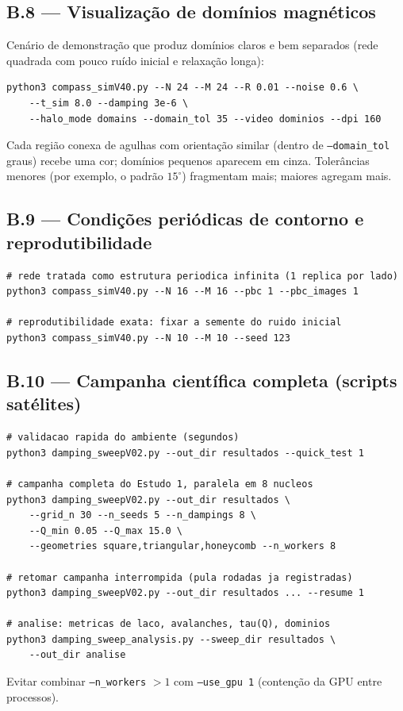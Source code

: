 \documentclass[11pt,a4paper]{article}
\newcommand{\code}[1]{\texttt{#1}}
\begin{document}
\subsection*{B.8 --- Visualização de domínios magnéticos}

Cenário de demonstração que produz domínios claros e bem separados
(rede quadrada com pouco ruído inicial e relaxação longa):
\begin{verbatim}
python3 compass_simV40.py --N 24 --M 24 --R 0.01 --noise 0.6 \
    --t_sim 8.0 --damping 3e-6 \
    --halo_mode domains --domain_tol 35 --video dominios --dpi 160
\end{verbatim}
Cada região conexa de agulhas com orientação similar (dentro de
\code{--domain\_tol} graus) recebe uma cor; domínios pequenos aparecem
em cinza. Tolerâncias menores (por exemplo, o padrão $15^\circ$)
fragmentam mais; maiores agregam mais.

\subsection*{B.9 --- Condições periódicas de contorno e
reprodutibilidade}

\begin{verbatim}
# rede tratada como estrutura periodica infinita (1 replica por lado)
python3 compass_simV40.py --N 16 --M 16 --pbc 1 --pbc_images 1

# reprodutibilidade exata: fixar a semente do ruido inicial
python3 compass_simV40.py --N 10 --M 10 --seed 123
\end{verbatim}

\subsection*{B.10 --- Campanha científica completa (scripts satélites)}

\begin{verbatim}
# validacao rapida do ambiente (segundos)
python3 damping_sweepV02.py --out_dir resultados --quick_test 1

# campanha completa do Estudo 1, paralela em 8 nucleos
python3 damping_sweepV02.py --out_dir resultados \
    --grid_n 30 --n_seeds 5 --n_dampings 8 \
    --Q_min 0.05 --Q_max 15.0 \
    --geometries square,triangular,honeycomb --n_workers 8

# retomar campanha interrompida (pula rodadas ja registradas)
python3 damping_sweepV02.py --out_dir resultados ... --resume 1

# analise: metricas de laco, avalanches, tau(Q), dominios
python3 damping_sweep_analysis.py --sweep_dir resultados \
    --out_dir analise
\end{verbatim}
Evitar combinar \code{--n\_workers} $> 1$ com \code{--use\_gpu 1}
(contenção da GPU entre processos).
\end{document}

